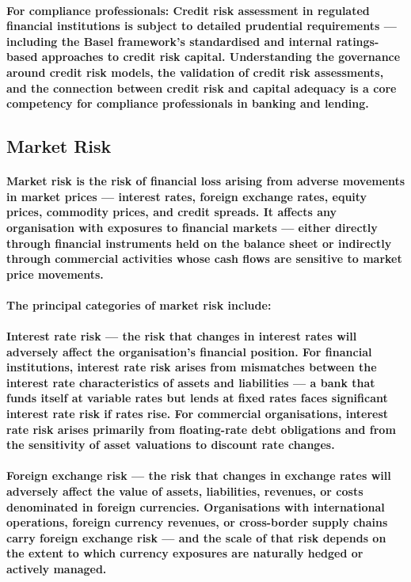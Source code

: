 \paragraph{\textbf{For compliance professionals}: Credit risk assessment in regulated financial institutions is subject to detailed prudential requirements — including the Basel framework's standardised and internal ratings-based approaches to credit risk capital. Understanding the governance around credit risk models, the validation of credit risk assessments, and the connection between credit risk and capital adequacy is a core competency for compliance professionals in banking and lending.}

\subsection{Market Risk}
\paragraph{\textbf{Market risk} is the risk of financial loss arising from adverse movements in market prices — interest rates, foreign exchange rates, equity prices, commodity prices, and credit spreads. It affects any organisation with exposures to financial markets — either directly through financial instruments held on the balance sheet or indirectly through commercial activities whose cash flows are sensitive to market price movements.}
\paragraph{The principal categories of market risk include:}
\paragraph{\textbf{Interest rate risk} — the risk that changes in interest rates will adversely affect the organisation's financial position. For financial institutions, interest rate risk arises from mismatches between the interest rate characteristics of assets and liabilities — a bank that funds itself at variable rates but lends at fixed rates faces significant interest rate risk if rates rise. For commercial organisations, interest rate risk arises primarily from floating-rate debt obligations and from the sensitivity of asset valuations to discount rate changes.}
\paragraph{\textbf{Foreign exchange risk} — the risk that changes in exchange rates will adversely affect the value of assets, liabilities, revenues, or costs denominated in foreign currencies. Organisations with international operations, foreign currency revenues, or cross-border supply chains carry foreign exchange risk — and the scale of that risk depends on the extent to which currency exposures are naturally hedged or actively managed.}
